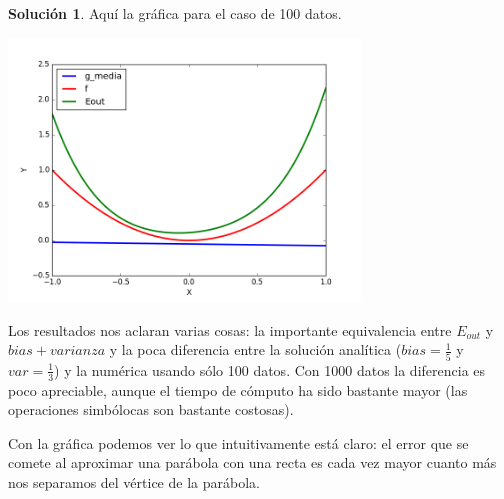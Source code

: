 \documentclass[a4paper, 11pt]{article}
\theoremstyle{definition}
\newtheorem*{solucion}{Solución}
\begin{document}
\begin{solucion}
    Aquí la gráfica para el caso de 100 datos.

    \centerline{\includegraphics[width=0.7\textwidth]{salida_bonus.png}}

    Los resultados nos aclaran varias cosas: la importante equivalencia entre $E_{out}$ y $bias+varianza$ y la poca diferencia entre la solución analítica ($bias=\frac{1}{5}$ y $var=\frac{1}{3}$) y la numérica usando sólo 100 datos. Con 1000 datos la diferencia es poco apreciable, aunque el tiempo de cómputo ha sido bastante mayor (las operaciones simbólocas son bastante costosas).

    Con la gráfica podemos ver lo que intuitivamente está claro: el error que se comete al aproximar una parábola con una recta es cada vez mayor cuanto más nos separamos del vértice de la parábola.



  \end{solucion}
\end{document}
